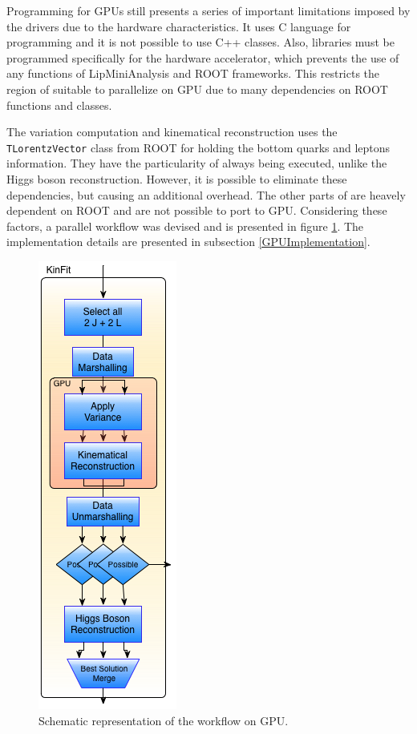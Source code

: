 Programming for GPUs still presents a series of important limitations imposed by the drivers due to the hardware characteristics. It uses C language for programming and it is not possible to use C++ classes. Also, libraries must be programmed specifically for the hardware accelerator, which prevents the use of any functions of LipMiniAnalysis and ROOT frameworks. This restricts the region of \ttDilepKinFit suitable to parallelize on GPU due to many dependencies on ROOT functions and classes.

The variation computation and kinematical reconstruction uses the \texttt{TLorentzVector} class from ROOT for holding the bottom quarks and leptons information. They have the particularity of always being executed, unlike the Higgs boson reconstruction. However, it is possible to eliminate these dependencies, but causing an additional overhead. The other parts of \ttDilepKinFit are heavely dependent on ROOT and are not possible to port to GPU. Considering these factors, a parallel workflow was devised and is presented in figure \ref{fig:GPUPipeline}. The implementation details are presented in subsection \ref{GPUImplementation}. 

\begin{figure}[!htp]
	\begin{center}
		\includegraphics[scale=0.6]{../../common/img/gpu_pipeline.png}
		\caption{Schematic representation of the \ttDilepKinFit workflow on GPU.}
		\label{fig:GPUPipeline}
	\end{center}
\end{figure}

